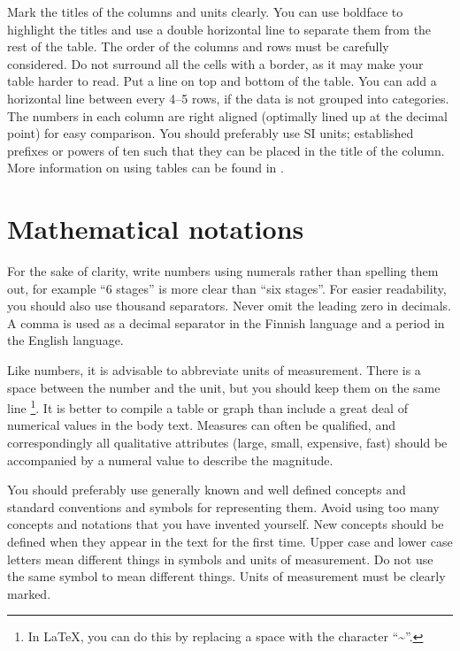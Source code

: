 \documentclass[twoside,draftfooter]{tutthesis} %
\begin{document}
Mark the titles of the columns and units clearly.
You can use boldface to highlight the titles and use a double horizontal line to separate them from the rest of the table. The order of the columns and rows must be carefully considered.
Do not surround all the cells with a border, as it may make your table harder to read.
Put a line on top and bottom of the table.
You can add a horizontal line between every 4--5 rows, if the data is not grouped into categories. The numbers in each column are right aligned (optimally lined up at the decimal point) for easy comparison.
You should preferably use SI units; established prefixes or powers of ten such that they can be placed in the title of the column. More information on using tables can be found in \citep{Salminen2012}.

\section{Mathematical notations}

For the sake of clarity, write numbers using numerals rather than spelling them out, for example ``6 stages'' is more clear than ``six stages''.
For easier readability, you should also use thousand separators.
Never omit the leading zero in decimals.
A comma is used as a decimal separator in the Finnish language and a period in the English language.

Like numbers, it is advisable to abbreviate units of measurement.
There is a space between the number and the unit, but you should keep them on the same line \footnote{In LaTeX, you can do this by replacing a space with the character ``\textasciitilde''.}.
It is better to compile a table or graph than include a great deal of numerical values in the body text.
Measures can often be qualified, and correspondingly all qualitative attributes (large, small, expensive, fast) should be accompanied by a numeral value to describe the magnitude.



You should preferably use generally known and well defined concepts and standard conventions and symbols for representing them.
Avoid using too many concepts and notations that you have invented yourself.
New concepts should be defined when they appear in the text for the first time.
Upper case and lower case letters mean different things in symbols and units of measurement.
Do not use the same symbol to mean different things.
Units of measurement must be clearly marked.
\end{document}
